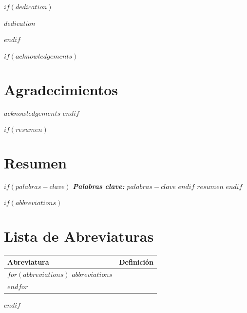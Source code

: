 $if(dedication)$
\cleardoublepage
\pagestyle{empty}
\null\vspace{4cm}
\begin{flushright}
  \itshape $dedication$
\end{flushright}
\cleardoublepage
$endif$

$if(acknowledgements)$
\cleardoublepage
\chapter*{Agradecimientos}
\pagestyle{plain}
$acknowledgements$
$endif$

$if(resumen)$
\cleardoublepage
\chapter*{Resumen}
\pagestyle{plain}
$if(palabras-clave)$
  \noindent\textit{\textbf{Palabras clave:} $palabras-clave$}
  \vspace{0.5cm}
$endif$
\noindent $resumen$
$endif$




$if(abbreviations)$
\cleardoublepage
\chapter*{Lista de Abreviaturas}
\pagestyle{plain}
\begin{longtable}{@{}p{3cm}p{11cm}@{}}
  \toprule
  \textbf{Abreviatura} & \textbf{Definici\'{o}n} \\
  \midrule
  \endhead
  $for(abbreviations)$
    $abbreviations$ \\
  $endfor$
  \bottomrule
\end{longtable}
$endif$

\cleardoublepage
{}
\pagestyle{fancy}
